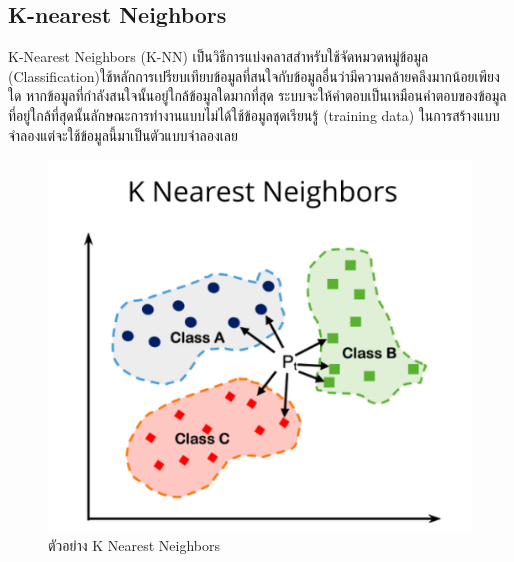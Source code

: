 \subsection{K-nearest Neighbors}
K-Nearest Neighbors (K-NN) เป็นวิธีการแบ่งคลาสสำหรับใช้จัดหมวดหมู่ข้อมูล (Classification)ใช้หลักการเปรียบเทียบข้อมูลที่สนใจกับข้อมูลอื่นว่ามีความคล้ายคลึงมากน้อยเพียงใด หากข้อมูลที่กำลังสนใจนั้นอยู่ใกล้ข้อมูลใดมากที่สุด ระบบจะให้คำตอบเป็นเหมือนคำตอบของข้อมูลที่อยู่ใกล้ที่สุดนั้นลักษณะการทำงานแบบไม่ได้ใช้ข้อมูลชุดเรียนรู้ (training data) ในการสร้างแบบจำลองแต่จะใช้ข้อมูลนี้มาเป็นตัวแบบจำลองเลย
\cite{knn}
\begin{figure}[h] %
    \begin{center}
    \includegraphics[width=0.4\linewidth]{image/knn.png}
    \end{center}
    \caption[Poem]{ตัวอย่าง K Nearest Neighbors\cite{knn}}
    \label{fig:knn}
    \end{figure}










